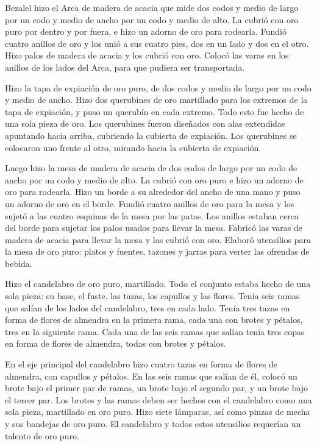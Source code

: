  Bezalel hizo el Arca de madera de acacia que mide dos codos
y medio de largo por un codo y medio de ancho por un codo y medio de
alto.  La cubrió con oro puro por dentro y por fuera, e hizo
un adorno de oro para rodearla.  Fundió cuatro anillos de
oro y los unió a sus cuatro pies, dos en un lado y dos en el otro.
 Hizo palos de madera de acacia y los cubrió con oro.
 Colocó las varas en los anillos de los lados del Arca, para
que pudiera ser transportada.

 Hizo la tapa de expiación de oro puro, de dos codos y medio
de largo por un codo y medio de ancho.  Hizo dos querubines
de oro martillado para los extremos de la tapa de expiación,
 y puso un querubín en cada extremo. Todo esto fue hecho de
una sola pieza de oro.  Los querubines fueron diseñados con
alas extendidas apuntando hacia arriba, cubriendo la cubierta de
expiación. Los querubines se colocaron uno frente al otro, mirando hacia
la cubierta de expiación.

 Luego hizo la mesa de madera de acacia de dos codos de
largo por un codo de ancho por un codo y medio de alto.  La
cubrió con oro puro e hizo un adorno de oro para rodearla. 
Hizo un borde a su alrededor del ancho de una mano y puso un adorno de
oro en el borde.  Fundió cuatro anillos de oro para la mesa
y los sujetó a las cuatro esquinas de la mesa por las patas.
 Los anillos estaban cerca del borde para sujetar los palos
usados para llevar la mesa.  Fabricó las varas de madera de
acacia para llevar la mesa y las cubrió con oro.  Elaboró
utensilios para la mesa de oro puro: platos y fuentes, tazones y jarras
para verter las ofrendas de bebida.

 Hizo el candelabro de oro puro, martillado. Todo el
conjunto estaba hecho de una sola pieza: su base, el fuste, las tazas,
los capullos y las flores.  Tenía seis ramas que salían de
los lados del candelabro, tres en cada lado. Tenía tres tazas en forma
de flores de almendra en la primera rama, cada una con brotes y pétalos,
tres en la siguiente rama.  Cada una de las seis ramas que
salían tenía tres copas en forma de flores de almendra, todas con brotes
y pétalos.

 En el eje principal del candelabro hizo cuatro tazas en
forma de flores de almendra, con capullos y pétalos.  En
las seis ramas que salían de él, colocó un brote bajo el primer par de
ramas, un brote bajo el segundo par, y un brote bajo el tercer par.
 Los brotes y las ramas deben ser hechos con el candelabro
como una sola pieza, martillado en oro puro.  Hizo siete
lámparas, así como pinzas de mecha y sus bandejas de oro puro.
 El candelabro y todos estos utensilios requerían un
talento de oro puro.

